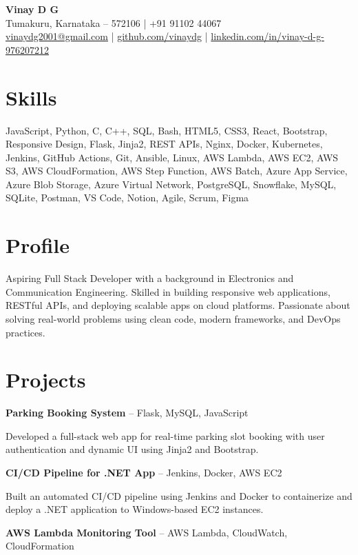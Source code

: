 \documentclass[a4paper,10pt]{article}
\begin{document}
\begin{center}
    \textbf{\Large Vinay D G} \\
    Tumakuru, Karnataka – 572106 \quad | \quad +91 91102 44067 \\
    \href{mailto:vinaydg2001@gmail.com}{vinaydg2001@gmail.com} \quad | \quad
    \href{https://github.com/vinaydg}{github.com/vinaydg} \quad | \quad
    \href{https://www.linkedin.com/in/vinay-d-g-976207212/}{linkedin.com/in/vinay-d-g-976207212}
\end{center}

\section*{Skills}
JavaScript, Python, C, C++, SQL, Bash, HTML5, CSS3, React, Bootstrap, Responsive Design, Flask, Jinja2, REST APIs, Nginx, Docker, Kubernetes, Jenkins, GitHub Actions, Git, Ansible, Linux, AWS Lambda, AWS EC2, AWS S3, AWS CloudFormation, AWS Step Function, AWS Batch, Azure App Service, Azure Blob Storage, Azure Virtual Network, PostgreSQL, Snowflake, MySQL, SQLite, Postman, VS Code, Notion, Agile, Scrum, Figma

\section*{Profile}
Aspiring Full Stack Developer with a background in Electronics and Communication Engineering. Skilled in building responsive web applications, RESTful APIs, and deploying scalable apps on cloud platforms. Passionate about solving real-world problems using clean code, modern frameworks, and DevOps practices.

\section*{Projects}
\textbf{Parking Booking System} – Flask, MySQL, JavaScript

Developed a full-stack web app for real-time parking slot booking with user authentication and dynamic UI using Jinja2 and Bootstrap.

\textbf{CI/CD Pipeline for .NET App} – Jenkins, Docker, AWS EC2

Built an automated CI/CD pipeline using Jenkins and Docker to containerize and deploy a .NET application to Windows-based EC2 instances.

\textbf{AWS Lambda Monitoring Tool} – AWS Lambda, CloudWatch, CloudFormation
\end{document}
